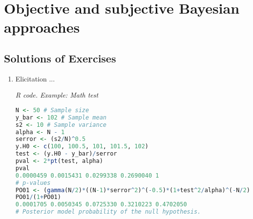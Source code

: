 \chapter{Objective and subjective Bayesian approaches}\label{chap3}

\section{Solutions of Exercises}\label{sec31}
\begin{enumerate}[leftmargin=*]
\item Elicitation ...


\begin{tcolorbox}[enhanced,width=4.67in,center upper,
	fontupper=\large\bfseries,drop shadow southwest,sharp corners]
	\textit{R code. Example: Math test}
\begin{VF}
\begin{lstlisting}[language=R]
N <- 50 # Sample size
y_bar <- 102 # Sample mean 
s2 <- 10 # Sample variance
alpha <- N - 1
serror <- (s2/N)^0.5 
y.H0 <- c(100, 100.5, 101, 101.5, 102)
test <- (y.H0 - y_bar)/serror
pval <- 2*pt(test, alpha)
pval
0.0000459 0.0015431 0.0299338 0.2690040 1
# p-values
PO01 <- (gamma(N/2)*((N-1)*serror^2)^(-0.5)*(1+test^2/alpha)^(-N/2))/(gamma(1/2)*gamma((N-1)/2))
PO01/(1+PO01)
0.0001705 0.0050345 0.0725330 0.3210223 0.4702050
# Posterior model probability of the null hypothesis.
\end{lstlisting}
\end{VF}
\end{tcolorbox}
\end{enumerate}